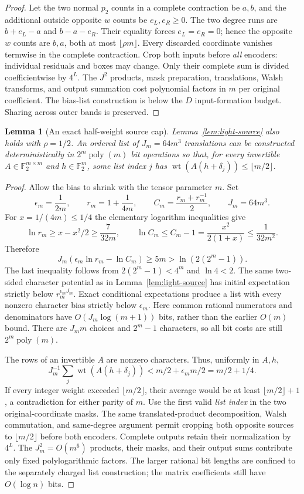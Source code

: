 \documentclass[11pt]{article}
\newtheorem{lemma}[theorem]{Lemma}
\begin{document}
\begin{proof}
Let the two normal $p_2$ counts in a complete contraction be $a,b$,
and the additional outside opposite $w$ counts be $e_L,e_R\ge0$.
The two degree runs are $b+e_L-a$ and $b-a-e_R$. Their equality
forces $e_L=e_R=0$; hence the opposite $w$ counts are $b,a$, both
at most $\lfloor\rho m\rfloor$. Every discarded coordinate vanishes
termwise in the complete contraction. Crop both inputs before
\emph{all} encoders: individual residuals and boxes may change.
Only their complete sum is divided coefficientwise by $4^L$.
The $J^2$ products, mask preparation, translations, Walsh transforms,
and output summation cost polynomial factors in $m$ per original
coefficient. The bias-list construction is below the $D$ input-formation
budget. Sharing across outer bands is preserved.
\end{proof}

\begin{lemma}[An exact half-weight source cap]
\label{lem:half-source}
Lemma~\ref{lem:light-source} also holds with $\rho=1/2$. An ordered
list of $J_m=64m^3$ translations can be constructed deterministically
in $2^m\operatorname{poly}(m)$ bit operations so that, for every
invertible $A\in\mathbb F_2^{m\times m}$ and $h\in\mathbb F_2^m$,
some list index $j$ has
$\operatorname{wt}(A(h+\delta_j))\le\lfloor m/2\rfloor$.
\end{lemma}
\begin{proof}
Allow the bias to shrink with the tensor parameter $m$. Set
\[
 \epsilon_m=\frac1{2m},\qquad r_m=1+\frac1{4m},\qquad
 C_m=\frac{r_m+r_m^{-1}}2,\qquad J_m=64m^3 .
\]
For $x=1/(4m)\le1/4$ the elementary logarithm inequalities give
\[
 \ln r_m\ge x-x^2/2\ge\frac7{32m},\qquad
 \ln C_m\le C_m-1=\frac{x^2}{2(1+x)}\le\frac1{32m^2}.
\]
Therefore
\[
 J_m(\epsilon_m\ln r_m-\ln C_m)\ge5m
 >\ln(2(2^m-1)).
\]
The last inequality follows from $2(2^m-1)<4^m$ and $\ln4<2$.
The same two-sided character potential as in
Lemma~\ref{lem:light-source} has initial expectation strictly below
$r_m^{\epsilon_m J_m}$. Exact conditional expectations produce a
list with every nonzero character bias strictly below $\epsilon_m$.
Here common rational numerators and denominators have
$O(J_m\log(m+1))$ bits, rather than the earlier $O(m)$ bound.
There are $J_m m$ choices and $2^m-1$ characters, so all bit costs
are still $2^m\operatorname{poly}(m)$.

The rows of an invertible $A$ are nonzero characters. Thus, uniformly
in $A,h$,
\[
 J_m^{-1}\sum_j\operatorname{wt}(A(h+\delta_j))
 <m/2+\epsilon_m m/2=m/2+1/4.
\]
If every integer weight exceeded $\lfloor m/2\rfloor$, their
average would be at least $\lfloor m/2\rfloor+1$, a contradiction
for either parity of $m$. Use the first valid \emph{list index}
in the two original-coordinate masks. The same translated-product
decomposition, Walsh commutation, and same-degree argument permit
cropping both opposite sources to $\lfloor m/2\rfloor$ before
both encoders. Complete outputs retain their normalization by $4^L$.
The $J_m^2=O(m^6)$ products, their masks, and their output sums
contribute only fixed polylogarithmic factors. The larger rational
bit lengths are confined to the separately charged list construction;
the matrix coefficients still have $O(\log n)$ bits.
\end{proof}
\end{document}
